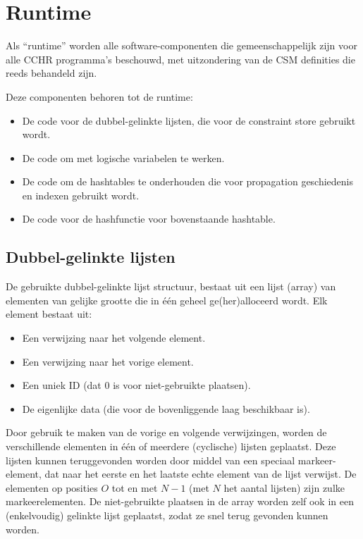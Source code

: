 {\section{Runtime} \label{sec:runtime}

Als ``runtime'' worden alle software-componenten die gemeenschappelijk zijn voor alle CCHR programma's beschouwd, met uitzondering van de CSM definities die reeds behandeld zijn.

Deze componenten behoren tot de runtime: \begin{itemize}
  \item De code voor de dubbel-gelinkte lijsten, die voor de constraint store gebruikt wordt.
  \item De code om met logische variabelen te werken.
  \item De code om de hashtables te onderhouden die voor propagation geschiedenis en indexen gebruikt wordt.
  \item De code voor de hashfunctie voor bovenstaande hashtable.
\end{itemize}

\subsection{Dubbel-gelinkte lijsten} \label{sec:dll}

De gebruikte dubbel-gelinkte lijst structuur, bestaat uit een lijst (array) van elementen van gelijke grootte die in \'e\'en geheel ge(her)alloceerd wordt. Elk element bestaat uit: \begin{itemize}
  \item Een verwijzing naar het volgende element.
  \item Een verwijzing naar het vorige element.
  \item Een uniek ID (dat $0$ is voor niet-gebruikte plaatsen).
  \item De eigenlijke data (die voor de bovenliggende laag beschikbaar is).
\end{itemize}
Door gebruik te maken van de vorige en volgende verwijzingen, worden de verschillende elementen in \'e\'en of meerdere (cyclische) lijsten geplaatst. Deze lijsten kunnen teruggevonden worden door middel van een speciaal markeer-element, dat naar het eerste en het laatste echte element van de lijst verwijst. De elementen op posities $O$ tot en met $N-1$ (met $N$ het aantal lijsten) zijn zulke markeerelementen. De niet-gebruikte plaatsen in de array worden zelf ook in een (enkelvoudig) gelinkte lijst geplaatst, zodat ze snel terug gevonden kunnen worden.

}
